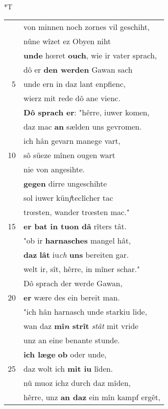 \documentclass[8pt,a4paper,notitlepage]{article}
\begin{document}
\begin{table}[ht]
\begin{minipage}[t]{0.5\linewidth}
\end{minipage}
\hspace{0.5cm}
\begin{minipage}[t]{0.5\linewidth}
\small
\begin{center}*T
\end{center}
\begin{tabular}{rl}
 & von minnen noch zornes vil geschiht,\\ 
 & nûne wîzet ez Obyen niht\\ 
 & \textbf{unde} hœret \textbf{ouch}, wie ir vater sprach,\\ 
 & dô er \textbf{den werden} Gawan sach\\ 
5 & unde ern in daz lant enpfienc,\\ 
 & wierz mit rede dô ane vienc.\\ 
 & \textbf{Dô sprach er}: "hêrre, iuwer komen,\\ 
 & daz mac \textbf{an} sælden uns gevromen.\\ 
 & ich hân gevarn manege vart,\\ 
10 & sô süeze mînen ougen wart\\ 
 & nie von angesihte.\\ 
 & \textbf{gegen} dirre ungeschihte\\ 
 & sol iuwer kün\textit{f}teclîcher tac\\ 
 & trœsten, wander trœsten mac."\\ 
15 & \textbf{er bat in tuon dâ} rîters tât.\\ 
 & "ob ir \textbf{harnasches} mangel hât,\\ 
 & \textbf{daz} \textbf{lât} iu\textit{ch} \textbf{uns} bereiten gar.\\ 
 & welt ir, sît, hêrre, in mîner schar."\\ 
 & Dô sprach der werde Gawan,\\ 
20 & \textbf{er} wære des ein bereit man.\\ 
 & "ich hân harnasch unde starkiu lide,\\ 
 & wan daz \textbf{mî\textit{n} strît} \textit{stât} mit vride\\ 
 & unz an eine benante stunde.\\ 
 & \textbf{ich læge} \textbf{ob} oder unde,\\ 
25 & daz wolt ich \textbf{mit iu} lîden.\\ 
 & nû muoz ichz durch daz mîden,\\ 
 & hêrre, unz \textbf{an daz} ein mîn kampf ergêt,\\ 

\end{tabular}
\end{minipage}
\end{table}
\end{document}
